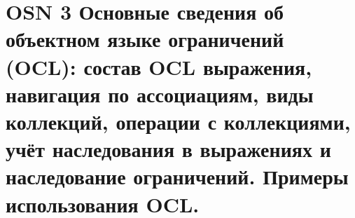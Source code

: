 \section*{OSN 3 Основные сведения об объектном языке ограничений (OCL): состав OCL выражения, навигация по ассоциациям, виды коллекций, операции с коллекциями, учёт наследования в выражениях и наследование ограничений. Примеры использования OCL.}
